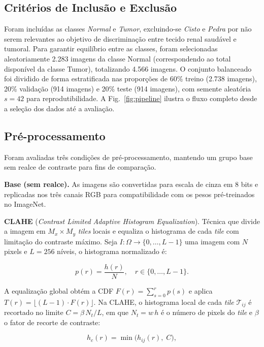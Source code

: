 \documentclass[conference]{IEEEtran}
\begin{document}
\subsection{Critérios de Inclusão e Exclusão}

Foram incluídas as classes \textit{Normal} e \textit{Tumor},
excluindo-se \textit{Cisto} e \textit{Pedra} por não serem relevantes ao
objetivo de discriminação entre tecido renal saudável e tumoral. Para
garantir equilíbrio entre as classes, foram selecionadas aleatoriamente
2.283 imagens da classe Normal (correspondendo ao total disponível da classe
Tumor), totalizando 4.566 imagens. O conjunto balanceado foi dividido de
forma estratificada nas proporções de 60\% treino (2.738 imagens), 20\%
validação (914 imagens) e 20\% teste (914 imagens), com semente aleatória
$s{=}42$ para reprodutibilidade. A Fig.~\ref{fig:pipeline} ilustra o fluxo
completo desde a seleção dos dados até a avaliação.

\subsection{Pré-processamento}

Foram avaliadas três condições de pré-processamento, mantendo um grupo base
sem realce de contraste para fins de comparação.

\textbf{Base (sem realce).} As imagens são convertidas para escala de cinza
em 8 bits e replicadas nos três canais RGB para compatibilidade com os pesos
pré-treinados no ImageNet.

\textbf{CLAHE} (\textit{Contrast Limited Adaptive Histogram Equalization}).
Técnica que divide a imagem em $M_x{\times}M_y$ \textit{tiles} locais e
equaliza o histograma de cada \textit{tile} com limitação do contraste máximo.
Seja $I : \Omega \to \{0,\ldots,L{-}1\}$ uma imagem com $N$ pixels e
$L = 256$ níveis, o histograma normalizado é:

\begin{equation}
    p(r) = \frac{h(r)}{N}, \quad r \in \{0,\ldots,L-1\}.
    \label{eq:pmf}
\end{equation}

\noindent A equalização global obtém a CDF $F(r) = \sum_{s=0}^{r} p(s)$ e
aplica $T(r) = \lfloor (L{-}1)\cdot F(r) \rfloor$. Na CLAHE, o histograma
local de cada \textit{tile} $\mathcal{T}_{ij}$ é recortado no limite
$C = \beta\,N_t / L$, em que $N_t = w\,h$ é o número de pixels do \textit{tile}
e $\beta$ o fator de recorte de contraste:

\begin{equation}
    h_c(r) = \min\!\bigl(h_{ij}(r),\; C\bigr),
    \label{eq:clip}
\end{equation}
\end{document}
